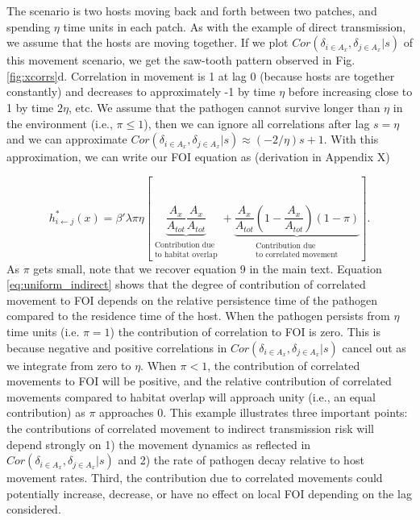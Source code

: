 \documentclass[letterpaper]{article}
\begin{document}
The scenario is two hosts moving back and forth between two patches, and spending $\eta$ time units in each patch.  As with the example of direct transmission, we assume that the hosts are moving together. If we plot $Cor(\delta_{i \in A_x}, \delta_{j \in A_x} | s)$ of this movement scenario, we get the saw-tooth pattern observed in Fig. \ref{fig:xcorrs}d.  
Correlation in movement is 1 at lag 0 (because hosts are together constantly) and decreases to approximately -1 by time $\eta$ before increasing close to 1 by time $2\eta$, etc. 
We assume that the pathogen cannot survive longer than $\eta$ in the environment (i.e., $\pi \leq 1$), then we can ignore all correlations after lag $s = \eta$ and we can approximate $Cor(\delta_{i \in A_x}, \delta_{j \in A_x} | s) \approx (-2 / \eta)s + 1$.  With this approximation, we can write our FOI equation as (derivation in Appendix X)


\begin{equation}
    h^*_{i \leftarrow j}(x) = \beta' \lambda \pi \eta \left[ \underbrace{\frac{A_x}{A_{tot}}\frac{A_x}{A_{tot}}}_{\substack{\text{Contribution due} \\ \text{to habitat overlap}}} + \underbrace{\frac{A_x}{A_{tot}}(1 - \frac{A_x}{A_{tot}}) (1 - \pi)}_{\substack{\text{Contribution due} \\ \text{to correlated movement}}} \right].
    \label{eq:uniform_indirect}
\end{equation}
As $\pi$ gets small, note that we recover equation 9 in the main text.  Equation \ref{eq:uniform_indirect} shows that the degree of contribution of correlated movement to FOI depends on the relative persistence time of the pathogen compared to the residence time of the host.  
When the pathogen persists from $\eta$ time units (i.e. $\pi = 1$) the contribution of correlation to FOI is zero.  This is because negative and positive correlations in $Cor(\delta_{i \in A_x}, \delta_{j \in A_x} | s)$ cancel out as we integrate from zero to $\eta$.  
When $\pi < 1$, the contribution of correlated movements to FOI will be positive, and the relative contribution of correlated movements compared to habitat overlap will approach unity (i.e., an equal contribution) as $\pi$ approaches 0. 
This example illustrates three important points: the contributions of correlated movement to indirect transmission risk will depend strongly on 1) the movement dynamics as reflected in $Cor(\delta_{i \in A_x}, \delta_{j \in A_x} | s)$ and 2) the rate of pathogen decay relative to host movement rates.  Third, the contribution due to correlated movements could potentially increase, decrease, or have no effect on local FOI depending on the lag considered.  
\end{document}
